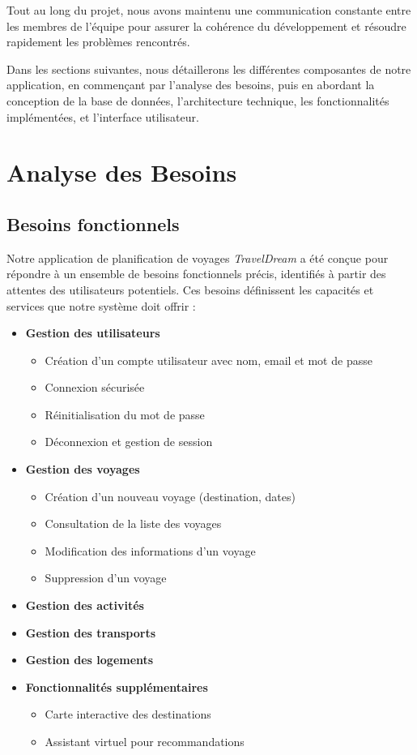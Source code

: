 \documentclass[a4paper,12pt]{article}
\begin{document}
Tout au long du projet, nous avons maintenu une communication constante entre les membres de l'équipe pour assurer la cohérence du développement et résoudre rapidement les problèmes rencontrés.

Dans les sections suivantes, nous détaillerons les différentes composantes de notre application, en commençant par l'analyse des besoins, puis en abordant la conception de la base de données, l'architecture technique, les fonctionnalités implémentées, et l'interface utilisateur.


\section{Analyse des Besoins}

\subsection{Besoins fonctionnels}

Notre application de planification de voyages \textit{TravelDream} a été conçue pour répondre à un ensemble de besoins fonctionnels précis, identifiés à partir des attentes des utilisateurs potentiels. Ces besoins définissent les capacités et services que notre système doit offrir :

\begin{itemize}
  \item \textbf{Gestion des utilisateurs}
  \begin{itemize}
    \item Création d'un compte utilisateur avec nom, email et mot de passe
    \item Connexion sécurisée
    \item Réinitialisation du mot de passe
    \item Déconnexion et gestion de session
  \end{itemize}

  \item \textbf{Gestion des voyages}
  \begin{itemize}
    \item Création d’un nouveau voyage (destination, dates)
    \item Consultation de la liste des voyages
    \item Modification des informations d’un voyage
    \item Suppression d’un voyage
  \end{itemize}

  \item \textbf{Gestion des activités}
  \item \textbf{Gestion des transports}
  \item \textbf{Gestion des logements}
  \item \textbf{Fonctionnalités supplémentaires}
  \begin{itemize}
    \item Carte interactive des destinations
    \item Assistant virtuel pour recommandations
  \end{itemize}
\end{itemize}
\end{document}
